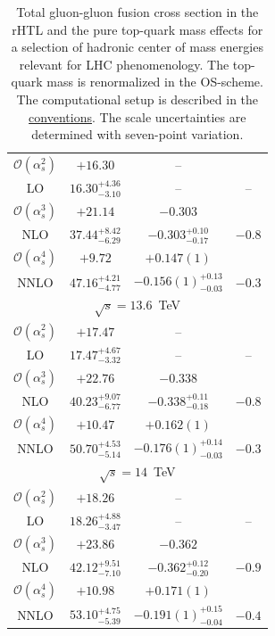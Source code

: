 \begin{table}[t]
\begin{tabular}{cccc}
\hline
$\mathcal{O}(\alpha_s^2)$ & $+16.30$ & -- &   \\
LO & $16.30^{+4.36}_{-3.10}$ & -- & --  \\
\hline
$\mathcal{O}(\alpha_s^3)$ & $+21.14$ & $-0.303$ &  \\
NLO & $37.44^{+8.42}_{-6.29}$ & $-0.303^{+0.10}_{-0.17}$ & $-0.8$  \\
\hline
$\mathcal{O}(\alpha_s^4)$ & $+9.72$ & $+0.147(1)$ &   \\
NNLO & $47.16^{+4.21}_{-4.77}$ & $-0.156(1)^{+0.13}_{-0.03}$ & $-0.3$  \\
\hline
\hline
\multicolumn{4}{c}{$\sqrt{s}=13.6$~TeV}\\
\hline
$\mathcal{O}(\alpha_s^2)$ & $+17.47$ & -- &   \\
LO & $17.47^{+4.67}_{-3.32}$ & -- & --  \\
\hline
$\mathcal{O}(\alpha_s^3)$ & $+22.76$ & $-0.338$ &   \\
NLO & $40.23^{+9.07}_{-6.77}$ & $-0.338^{+0.11}_{-0.18}$ & $-0.8$  \\
\hline
$\mathcal{O}(\alpha_s^4)$ & $+10.47$ & $+0.162(1)$ &  \\
NNLO & $50.70^{+4.53}_{-5.14}$ & $-0.176(1)^{+0.14}_{-0.03}$ & $-0.3$  \\
\hline
\hline
\multicolumn{4}{c}{$\sqrt{s}=14$~TeV}\\
\hline
$\mathcal{O}(\alpha_s^2)$ & $+18.26$ & -- &   \\
LO & $18.26^{+4.88}_{-3.47}$ & -- & --  \\
\hline
$\mathcal{O}(\alpha_s^3)$ & $+23.86$ & $-0.362$ &   \\
NLO & $42.12^{+9.51}_{-7.10}$ & $-0.362^{+0.12}_{-0.20}$ & $-0.9$  \\
\hline
$\mathcal{O}(\alpha_s^4)$ & $+10.98$ & $+0.171(1)$ &   \\
NNLO & $53.10^{+4.75}_{-5.39}$ & $-0.191(1)^{+0.15}_{-0.04}$ & $-0.4$  \\
\hline
\end{tabular}
\caption{Total gluon-gluon fusion cross section in the \acs{rHTL} and the pure top-quark mass effects for a selection of hadronic center of mass energies relevant for \acs{LHC} phenomenology. The top-quark mass is renormalized in the \acs{OS}-scheme. The computational setup is described in the \hyperref[chap:notation_and_conventions]{conventions}. The scale uncertainties are determined with seven-point variation.}
\label{tab:6:t-HEFT}
\end{table}

